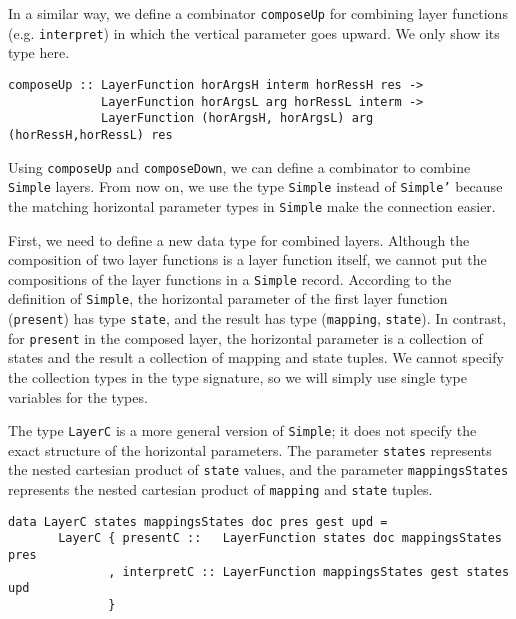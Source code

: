 
In a similar way, we define a combinator \texttt{composeUp} for combining layer functions (e.g. \texttt{interpret}) in which the vertical parameter goes upward. We only show its type here.

\begin{small}
\begin{verbatim}
composeUp :: LayerFunction horArgsH interm horRessH res ->
             LayerFunction horArgsL arg horRessL interm ->
             LayerFunction (horArgsH, horArgsL) arg (horRessH,horRessL) res
\end{verbatim}
\end{small}


 Using \texttt{composeUp} and \texttt{composeDown}, we can define a combinator to combine \texttt{Simple} layers. From now on, we use the type \texttt{Simple} instead of \texttt{Simple'} because the matching horizontal parameter types in \texttt{Simple} make the connection easier. 

First, we need to define a new data type for combined layers. Although the composition of two layer functions is a layer function itself, we cannot put the compositions of the layer functions in a \texttt{Simple} record. According to the definition of \texttt{Simple}, the horizontal parameter of the first layer function (\texttt{present}) has type \texttt{state}, and the result has type (\texttt{mapping}, \texttt{state}). In contrast, for \texttt{present} in the composed layer, the horizontal parameter is a collection of states and the result a collection of mapping and state tuples. We cannot specify the collection types in the type signature, so we will simply use single type variables for the types.

The type \texttt{LayerC} is a more general version of \texttt{Simple}; it does not specify the exact structure of the horizontal parameters. The parameter \texttt{states} represents the nested cartesian product of \texttt{state} values, and the parameter \texttt{mappingsStates} represents the nested cartesian product of \texttt{mapping} and \texttt{state} tuples.

\begin{small}
\begin{verbatim}
data LayerC states mappingsStates doc pres gest upd =
       LayerC { presentC ::   LayerFunction states doc mappingsStates pres
              , interpretC :: LayerFunction mappingsStates gest states upd
              }

\end{verbatim}
\end{small}

